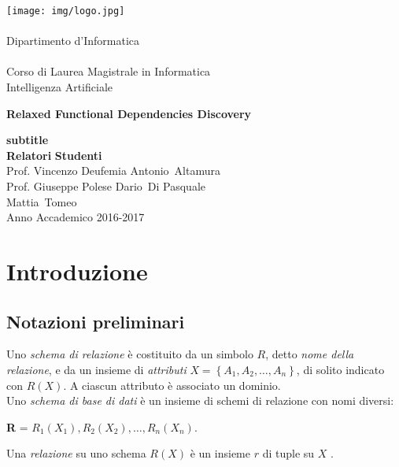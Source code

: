 \documentclass[11pt]{article}
\begin{document}
	\begin{titlepage}
		\begin{center}
			\texttt{[image: img/logo.jpg]}\\[0.2truecm]
			\\[0.2truecm]
			{\large Dipartimento d'Informatica}\\
			\hrulefill \\[0.2truecm]
			{\large Corso di Laurea Magistrale in Informatica}\\[0.2truecm]
			{\large Intelligenza Artificiale }\\[3truecm]
			
			\vfill
			{\Huge \textbf{Relaxed Functional Dependencies Discovery}\par }
			\vfill
			{\large \textbf{subtitle}}
			\\[3.0truecm]
			
			{\bf Relatori} \hfill {\bf Studenti}\ \ \\
			Prof. Vincenzo Deufemia \hfill Antonio~Altamura\\
			Prof. Giuseppe Polese \hfill Dario~Di Pasquale \\
			\hfill Mattia~Tomeo
			\vfill
			\hrulefill
			\hrulefill\\
			Anno Accademico 2016-2017
		\end{center}
	\end{titlepage}
	
\renewcommand*\contentsname{Indice}
\tableofcontents
\newpage

\section{Introduzione}
\subsection{Notazioni preliminari}
Uno \textit{schema di relazione} è costituito da un simbolo $R$, detto \textit{nome della relazione}, e da un insieme di \textit{attributi} $X = \left\{ A_1, A_2,\ldots, A_n \right\}$, di solito indicato con $R(X)$. A ciascun attributo è associato un dominio. \\
Uno \textit{schema di base di dati} è un insieme di schemi di relazione con nomi diversi:
\begin{center}
	\textbf{R} = $R_1(X_1), R_2(X_2), \ldots, R_n(X_n)$.
\end{center}
Una \textit{relazione} su uno schema $R(X)$ è un insieme $r$ di tuple su $X$ \cite{atzeni1999basi}.
\end{document}
